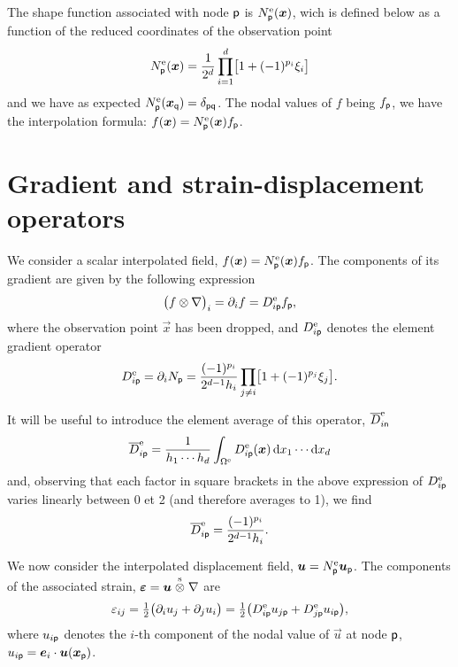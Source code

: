 The shape function associated with node \(\mathsf{p}\) is
\(N^{\mathrm{e}}_{\mathsf{p}}(\boldsymbol x)\), wich is defined below as a function of the
reduced coordinates of the observation point
\begin{equation}
  N^{\mathrm{e}}_{\mathsf{p}}(\boldsymbol x)=\frac1{2^d}\prod_{i=1}^d\bigl[1+(-1)^{p_i}\xi_i\bigr]
\end{equation}
and we have as expected
\(N^{\mathrm{e}}_{\mathsf{p}}(\boldsymbol x_{\mathsf q}) = \delta_{\mathsf{p}\mathsf{q}}\). The
nodal values of \(f\) being \(f_\mathsf{p}\), we have the interpolation formula:
\(f(\boldsymbol x)=N^{\mathrm{e}}_\mathsf{p}(\boldsymbol x)f_\mathsf{p}\).

\section{Gradient and strain-displacement operators}

We consider a scalar interpolated field,
\(f(\boldsymbol x)=N^{\mathrm{e}}_\mathsf{p}(\boldsymbol x)f_\mathsf{p}\). The components of its
gradient are given by the following expression
\begin{equation}
  \bigl(f\otimes\nabla\bigr)_i=\partial_i f=D_{i\mathsf{p}}^{\mathrm{e}} f_\mathsf{p},
\end{equation}
where the observation point \(\vec x\) has been dropped, and
\(D_{i\mathsf{p}}^{\mathrm{e}}\) denotes the element gradient operator
\begin{equation}
  D_{i\mathsf{p}}^{\mathrm{e}}=\partial_iN_\mathsf{p}
  =\frac{(-1)^{p_i}}{2^{d-1}h_i}
  \prod_{j\neq i}\bigl[1+(-1)^{p_j}\xi_j\bigr].
\end{equation}

It will be useful to introduce the element average of this operator,
\(\overline{D}_{i\mathsf{n}}^{\mathrm{e}}\)
\begin{equation}
  \overline{D}_{i\mathsf{p}}^{\mathrm{e}}=\frac 1{h_1\cdots h_d}
  \int_{\Omega^{\mathrm{e}}}D^{\mathrm{e}}_{i\mathsf{p}}(\boldsymbol x)\,\mathrm d x_1\cdots\mathrm d x_d
\end{equation}
and, observing that each factor in square brackets in the above expression of
\(D^{\mathrm{e}}_{i\mathsf{p}}\) varies linearly between 0 et 2 (and therefore
averages to 1), we find
\begin{equation}
  \overline{D}^{\mathrm{e}}_{i\mathsf{p}}=\frac{(-1)^{p_i}}{2^{d-1}h_i}.
\end{equation}

We now consider the interpolated displacement field,
\(\boldsymbol u = N^{\mathrm{e}}_\mathsf{p} \boldsymbol u_\mathsf{p}\). The components of the
associated strain, \(\boldsymbol\varepsilon=\boldsymbol u\stackrel{\mathrm{s}}{\otimes}\nabla\) are
\begin{equation}
  \varepsilon_{ij}=\tfrac12\bigl(\partial_iu_j+\partial_ju_i\bigr)
  =\tfrac12\bigl(D^{\mathrm{e}}_{i\mathsf{p}}u_{j\mathsf{p}}
  +D^{\mathrm{e}}_{j\mathsf{p}}u_{i\mathsf{p}}\bigr),
\end{equation}
where \(u_{i\mathsf{p}}\) denotes the \(i\)-th component of the nodal value of
\(\vec u\) at node \(\mathsf{p}\),
\(u_{i\mathsf{p}}=\boldsymbol e_i\cdot\boldsymbol u(\boldsymbol x_\mathsf{p})\).

